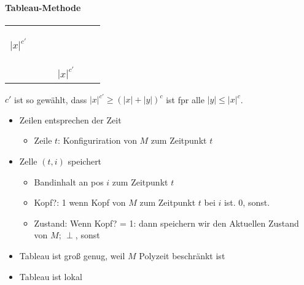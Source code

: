 \paragraph*{Tableau-Methode}
\begin{center}
 \begin{tabular}{c|c|c|c|c|c|c|c|}\cline{2-8}
    & & & & & & & \\\cline{2-8}
    & & & & & & & \\\cline{2-8}
    & & & & & & & \\\cline{2-8}
    $|x|^{c'}$ & & & & & & & \\\cline{2-8}
    & & & & & & & \\\cline{2-8}
    & & & & & & & \\\cline{2-8}
    & & & & & & & \\\cline{2-8}
    \multicolumn{1}{c}{\ } & \multicolumn{7}{c}{$|x|^{c'}$}
 \end{tabular}
\end{center}
$c'$ ist so gewählt, dass $|x|^{c'} \geq (|x| + |y|)^c$ ist fpr alle $|y| \leq |x|^c$.
\begin{itemize}
 \item Zeilen entsprechen der Zeit
     \begin{itemize}
     \item Zeile $t$: Konfiguriration von $M$ zum Zeitpunkt $t$
     \end{itemize}
 \item Zelle $(t,i)$ speichert
     \begin{itemize}
     \item Bandinhalt an pos $i$ zum Zeitpunkt $t$
     \item Kopf?: 1 wenn Kopf von $M$ zum Zeitpunkt $t$ bei $i$ ist. 0, sonst.
     \item Zustand: Wenn Kopf? = 1: dann speichern wir den Aktuellen Zustand von $M$; $\perp$, sonst
     \end{itemize}
 \item Tableau ist groß genug, weil $M$ Polyzeit beschränkt ist
 \item Tableau ist lokal
\end{itemize}





